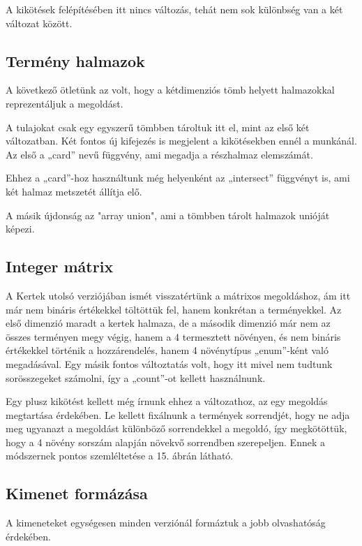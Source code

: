 \documentclass[12pt,a4paper,twoside, openright]{report}
\begin{document}
				
				A kikötések felépítésében itt nincs változás, tehát nem sok különbség van a két változat 
				között.
			\subsection{Termény halmazok}
				 A következő ötletünk az volt, hogy a kétdimenziós tömb helyett halmazokkal 
				reprezentáljuk a megoldást.
				
				
				A tulajokat csak egy egyszerű tömbben tároltuk itt el, mint az első két változatban. 
				Két fontos új kifejezés is megjelent a kikötésekben ennél a munkánál. Az első a „card” nevű függvény, ami megadja a részhalmaz elemszámát.
				
				
				Ehhez a „card”-hoz használtunk még helyenként az „intersect” függvényt is, ami két 
				halmaz metszetét állítja elő.
				
				
				A másik újdonság az "array union", ami a tömbben tárolt halmazok unióját képezi.
				
			\subsection{Integer mátrix}
				A Kertek utolsó verziójában ismét visszatértünk a mátrixos megoldáshoz, ám itt már nem bináris értékekkel töltöttük fel, hanem konkrétan a terményekkel. Az első dimenzió maradt a kertek halmaza, de a második dimenzió már nem az összes terményen megy végig, hanem a 4 termesztett növényen, és nem bináris értékekkel történik a hozzárendelés, hanem 4 növénytípus „enum”-ként való megadásával. Egy másik fontos változtatás volt, hogy itt mivel nem tudtunk sorösszegeket számolni, így a „count”-ot kellett használnunk. 
				
				
				Egy plusz kikötést kellett még írnunk ehhez a változathoz, az egy megoldás megtartása érdekében. Le kellett fixálnunk a termények sorrendjét, hogy ne adja meg ugyanazt a megoldást különböző sorrendekkel a megoldó, így megkötöttük, hogy a 4 növény sorszám alapján növekvő sorrendben szerepeljen. Ennek a módszernek pontos szemléltetése a 15. ábrán látható.
				
				
			\subsection{Kimenet formázása}
				A kimeneteket egységesen minden verziónál formáztuk a jobb olvashatóság érdekében.
				
\end{document}
